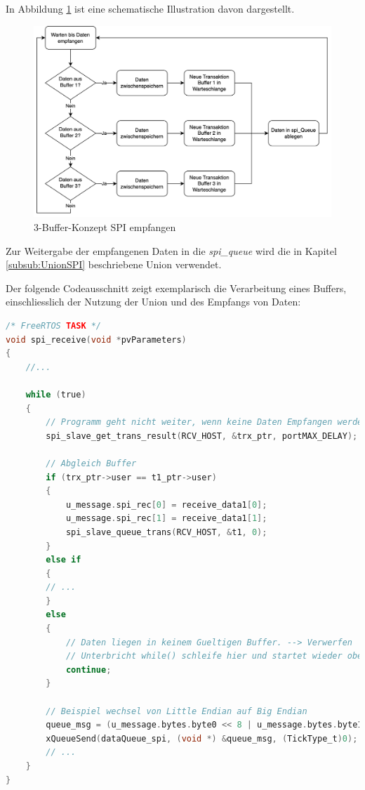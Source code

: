 In Abbildung \ref{fig:3BuffKonz} ist eine schematische Illustration davon dargestellt. 

\begin{figure}[H]
    \centering
    \includegraphics[width=0.9\linewidth]{Figures/Chap3/ESP/SPI_RECEIVE/Bufferkonzept_BLE.png}
    \caption{3-Buffer-Konzept SPI empfangen}
    \label{fig:3BuffKonz}
\end{figure}

Zur Weitergabe der empfangenen Daten in die \textit{spi\_queue} wird die in Kapitel \ref{subsub:UnionSPI} beschriebene Union verwendet.

Der folgende Codeausschnitt zeigt exemplarisch die Verarbeitung eines Buffers, einschliesslich der Nutzung der Union und des Empfangs von Daten:

\begin{lstlisting}[language=C]
/* FreeRTOS TASK */
void spi_receive(void *pvParameters)
{
    //...
    
    while (true)
    {
        // Programm geht nicht weiter, wenn keine Daten Empfangen werden.
        spi_slave_get_trans_result(RCV_HOST, &trx_ptr, portMAX_DELAY);

        // Abgleich Buffer
        if (trx_ptr->user == t1_ptr->user)
        {
            u_message.spi_rec[0] = receive_data1[0];
            u_message.spi_rec[1] = receive_data1[1];
            spi_slave_queue_trans(RCV_HOST, &t1, 0);
        } 
        else if
        {
        // ...
        }
        else
        {
            // Daten liegen in keinem Gueltigen Buffer. --> Verwerfen
            // Unterbricht while() schleife hier und startet wieder oben
            continue;
        }
        
        // Beispiel wechsel von Little Endian auf Big Endian
        queue_msg = (u_message.bytes.byte0 << 8 | u_message.bytes.byte1);
        xQueueSend(dataQueue_spi, (void *) &queue_msg, (TickType_t)0);
        // ...
    }
}
        
\end{lstlisting}


